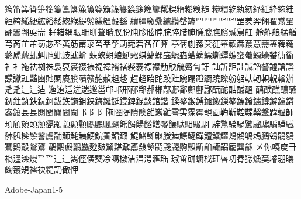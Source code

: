 筠筩筭筲箑箯篗篙簋簏簠簦簱簶籑籙籧籮籰粼粿糈糉糗糙
糝糫紇紈紉紓紝紣絁絓絙絝絺綆綋綌緌緫緱緹縈縑縕縠繇
繢繮繳纍纑纘罄罏⺫⺲罒⺱罓罡羑羿翎翟翥翬翮翯翺耎耑
耔耤耦耺耼聠聱聵肞肦肫胗胘脖脘脺腊腌膁膄膴臏臹舃舡
舲舴艆艋艏芎芮芷芾苆苾荃荑荕莆莍莒莘莩莿菀菪萏萑葊
葶蒨蒯蓀蓂蓰蓽蔌蔴蕞薏薷藎薭蘒蘩虒虣虬虯虺蚍蚑蚘蚧
蚨蛺蛽蜋蜓蜙蜞蜨蜾蝱螈螙螬螭螵蟖蟫蟭蠁蠆蠋蠔蠜衖衟
⻂衤袘袪袽袾裊裒裛裰裱褆褘褙褚褧褰褾襻觔觖觥觱訇訏
訕訢詎詿諴謟謷譃譄譔讜讞豇豔豳貤賙賡賸賾贛赩赬趄趍
趕趦跆跎跤跬踠蹋蹬蹰蹺躒躮躳軑軔軹輗輶辦⾡辵⻍辶迠
迤迶适逬遄邈邕邙邛邢邴郗郝郴鄗鄜鄱鄺鄽酈酛酡酤醎醞
醨醭醮醲醼釰釷釻鈇鈨鈳鈸鉃鉇鉏鉠鋂鋋鋌鋟錍錕錟錧鍇
鍒鍪鍭鎛鎺鎩鏁鏊鏢鏺鏽鐏鐴鐿鑕鑫鑲⻒镸閦閩閴閽闚⻏
⻖阝陁陘隄隤隩雒嶲雞雩雱霂霉靚靣靮靳鞚鞢鞵鞶韙韞韴
頊頎頞頣頫頾顒顓顙顬颸颺颿飈飥餲餳饀饍饜饟馱馹馺駉
騂騖騤騧騭騮騶騸驊驖骵骶髹鬃鬠鬳鬴魳魹鮧鯁鯇鯗鯧鯫
鯷鯺鯽鰋鰧鰪鰶鱁鱓鱣鱰鱷鴂鵂鵇鵣鵩鵼鵾鶍鶱鷃鷇鷖鷟
鷫鷴鸕鸝麤麨麬黧黮鼐鼒鼗鼙鼯鼷鼹齁齅齗齨齱齵龐龔龢
㐅你嘠廋⺕𣘺濹滦熳⺤爫⻌辶嶲俓僙僰凃噶橔洁淐湂滙珤
琡畬硑蟵𣏾玨㫳㓛䐌㺊龽䯨龼㻚㬢龾䕺䂓䙥䄃䊓䚮㒈𢘉

Adobe-Japan1-5

